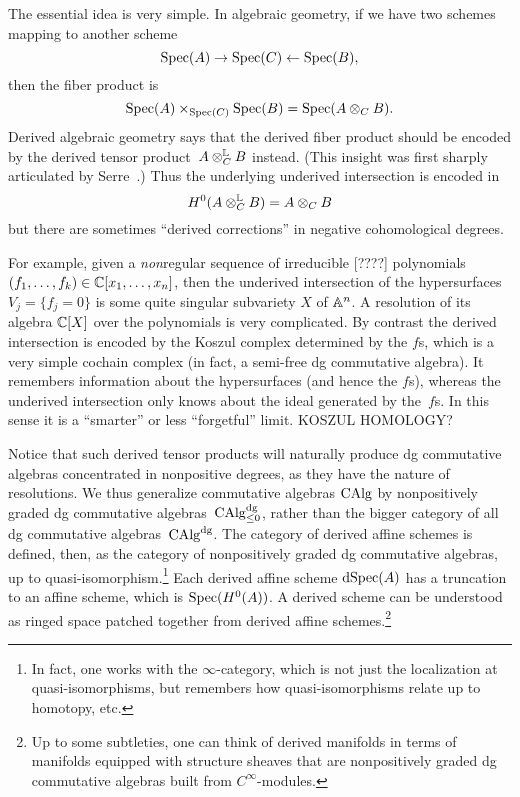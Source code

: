 \documentclass[11pt]{amsart}
\begin{document}
The essential idea is very simple.
In algebraic geometry, if we have two schemes mapping to another scheme
\[
\Spec(A) \to \Spec(C) \leftarrow \Spec(B),
\]
then the fiber product is
\[
\Spec(A) \times_{\Spec(C)} \Spec(B) = \Spec(A \otimes_C B).
\]
Derived algebraic geometry says that the derived fiber product should be encoded by the derived tensor product~$A \otimes_C^{\LL} B$ instead.
(This insight was first sharply articulated by Serre~\cite{}.)
Thus the underlying underived intersection is encoded in 
\[
H^0(A \otimes_C^{\LL} B) = A \otimes_C B
\]
but there are sometimes ``derived corrections'' in negative cohomological degrees.

For example, given a {\em non}\/regular sequence of irreducible [????] polynomials $(f_1,\ldots,f_k) \in \CC[x_1,\ldots,x_n]$, 
then the underived intersection of the hypersurfaces $V_j = \{f_j = 0\}$ is some quite singular subvariety $X$ of $\AA^n$.
A resolution of its algebra $\CC[X]$ over the polynomials is very complicated.
By contrast the derived intersection is encoded by the Koszul complex determined by the $f$s,
which is a very simple cochain complex (in fact, a semi-free dg commutative algebra). 
It remembers information about the hypersurfaces (and hence the $f$s), whereas the underived intersection only knows about the ideal generated by the~$f$s.
In this sense it is a ``smarter'' or less ``forgetful'' limit.
KOSZUL HOMOLOGY?

Notice that such derived tensor products will naturally produce dg commutative algebras concentrated in nonpositive degrees,
as they have the nature of resolutions.
We thus generalize commutative algebras $\CAlg$ by nonpositively graded dg commutative algebras~$\CAlg^{\dg}_{\leq 0}$, rather than the bigger category of all dg commutative algebras~$\CAlg^{\dg}$.
The category of derived affine schemes is defined, then, as the category of nonpositively graded dg commutative algebras, up to quasi-isomorphism.\footnote{In fact, one works with the $\infty$-category, which is not just the localization at quasi-isomorphisms, but remembers how quasi-isomorphisms relate up to homotopy, etc.}
Each derived affine scheme $\dSpec(A)$ has a truncation to an affine scheme, which is $\Spec(H^0(A))$.
A derived scheme can be understood as ringed space patched together from derived affine schemes.\footnote{Up to some subtleties, one can think of derived manifolds in terms of manifolds equipped with structure sheaves that are nonpositively graded dg commutative algebras built from $C^\infty$-modules.}
\end{document}
